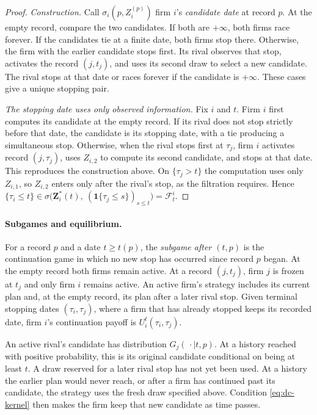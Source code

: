 \documentclass[12pt,reqno]{article}
\theoremstyle{definition} \newtheorem{example}{Example}
\theoremstyle{definition} \newtheorem{condition}{Condition}
\theoremstyle{definition} \newtheorem{corollary}{Corollary}
\theoremstyle{definition} \newtheorem{claim}{Claim}
\theoremstyle{definition} \newtheorem{definition}{Definition}
\theoremstyle{definition} \newtheorem{conjecture}{Conjecture}
\theoremstyle{definition} \newtheorem{Lemma}{Lemma}
\theoremstyle{definition} \newtheorem{lemma}{Lemma}
\theoremstyle{plain} \newtheorem{theorem}{Theorem}
\theoremstyle{definition} \newtheorem{assumption}{Assumption}
\theoremstyle{definition} \newtheorem*{assumptionnonumber}{Assumption}
\theoremstyle{definition} \newtheorem*{theoremNoNumber}{Proposition}
\theoremstyle{definition}
\theoremstyle{definition}\newtheorem{proposition}{Proposition}
\theoremstyle{definition} \newtheorem{result}{Result}
\theoremstyle{definition} \newtheorem*{definitionNoNumber}{Definition}
\theoremstyle{definition} \newtheorem{Definition}{Definition}
\theoremstyle{definition} \newtheorem*{DefinitionNoNumber}{Definition}
\theoremstyle{definition} \newtheorem*{fact}{Fact}
\theoremstyle{definition} \newtheorem*{property}{Property}
\theoremstyle{definition} \newtheorem{remark}{Remark}
\begin{document}
\begin{proof}
\emph{Construction.} Call $\sigma_i(p,Z_i^{(p)})$ firm $i$'s \emph{candidate date} at record $p$. At the empty record, compare the two candidates. If both are $+\infty$, both firms race forever. If the candidates tie at a finite date, both firms stop there. Otherwise, the firm with the earlier candidate stops first. Its rival observes that stop, activates the record $(j,t_j)$, and uses its second draw to select a new candidate. The rival stops at that date or races forever if the candidate is $+\infty$. These cases give a unique stopping pair.

\emph{The stopping date uses only observed information.} Fix $i$ and $t$. Firm $i$ first computes its candidate at the empty record. If its rival does not stop strictly before that date, the candidate is its stopping date, with a tie producing a simultaneous stop. Otherwise, when the rival stops first at $\tau_j$, firm $i$ activates record $(j,\tau_j)$, uses $Z_{i,2}$ to compute its second candidate, and stops at that date. This reproduces the construction above. On $\{\tau_j>t\}$ the computation uses only $Z_{i,1}$, so $Z_{i,2}$ enters only after the rival's stop, as the filtration requires. Hence
$
\{\tau_i\le t\}\in\sigma\big(\bm Z_i^\ast(t),\ (\mathbf 1\{\tau_j\le s\})_{s\le t}\big)=\mathcal F^i_t.$\end{proof}

\paragraph{Subgames and equilibrium.}
For a record $p$ and a date $t\ge t(p)$, the \emph{subgame after $(t,p)$} is the continuation game in which no new stop has occurred since record $p$ began. At the empty record both firms remain active. At a record $(j,t_j)$, firm $j$ is frozen at $t_j$ and only firm $i$ remains active. An active firm's strategy includes its current plan and, at the empty record, its plan after a later rival stop. Given terminal stopping dates $(\tau_i,\tau_j)$, where a firm that has already stopped keeps its recorded date, firm $i$'s continuation payoff is $U_i^t(\tau_i,\tau_j)$.

An active rival's candidate has distribution $G_j(\,\cdot\mid t,p)$. At a history reached with positive probability, this is its original candidate conditional on being at least $t$. A draw reserved for a later rival stop has not yet been used. At a history the earlier plan would never reach, or after a firm has continued past its candidate, the strategy uses the fresh draw specified above. Condition \eqref{eq:dc-kernel} then makes the firm keep that new candidate as time passes.
\end{document}
